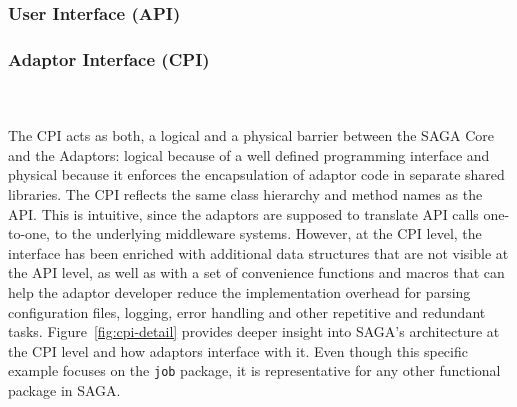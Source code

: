 

  


  \subsubsection{User Interface (API)}
 
 
  \subsubsection{Adaptor Interface (CPI)}
  \\
  \\
  

  The CPI acts as both,
  a logical and a physical barrier between the SAGA Core and the Adaptors:
  logical because of a well defined programming interface and physical because
  it enforces the encapsulation of adaptor code in separate shared libraries.
  The CPI reflects the same class hierarchy and method names as the API. This
  is intuitive, since the adaptors are supposed to translate API calls
  one-to-one, to the underlying middleware systems. However, at the CPI level,
  the interface has been enriched with additional data structures that are not
  visible at the API level, as well as with a set of convenience functions and
  macros that can help the adaptor developer reduce the implementation overhead
  for parsing configuration files, logging, error handling and other repetitive
  and redundant tasks. Figure~\ref{fig:cpi-detail} provides deeper insight into
  SAGA's architecture at the CPI level and how adaptors interface with it. Even
  though this specific example focuses on the \texttt{job} package, it is
  representative for any other functional package in SAGA.
 

